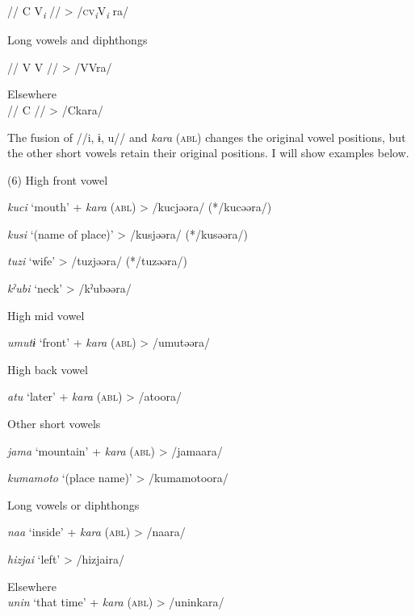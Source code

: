     //  C  V\textit{\textsubscript{i}}  //      >  /\textsc{cv}\textit{\textsubscript{i}}V\textit{\textsubscript{i} }ra/

 \ex Long vowels and diphthongs\\
\gll

    //  V  V  //      >  /VVra/

\ex  Elsewhere\\

    //  C  //        >  /Ckara/

The fusion of //i, ɨ, u// and \textit{kara} (\textsc{abl}) changes the original vowel positions, but the other short vowels retain their original positions. I will show examples below.

(6) \ea High front vowel  \\
\gll

    \textit{kuci}  ‘mouth’  +  \textit{kara} (\textsc{abl})  >  /kucjəəra/  (*/kucəəra/)

    \textit{kusi}  ‘(name of place)’      >  /kusjəəra/  (*/kusəəra/)

    \textit{tuzi}  ‘wife’      >  /tuzjəəra/  (*/tuzəəra/)

    \textit{kˀubi}  ‘neck’      >  /kˀubəəra/  

 \ex High mid vowel\\
\gll

    \textit{umutɨ}  ‘front’  +  \textit{kara} (\textsc{abl})  >  /umutəəra/

 \ex High back vowel  \\
\gll

    \textit{atu}  ‘later’  +  \textit{kara} (\textsc{abl})  >  /atoora/

 \ex Other short vowels\\
\gll

    \textit{jama}  ‘mountain’  +  \textit{kara} (\textsc{abl})  >  /jamaara/

    \textit{kumamoto}  ‘(place name)’      >  /kumamotoora/  

 \ex Long vowels or diphthongs  \\
\gll

    \textit{naa}  ‘inside’  +  \textit{kara} (\textsc{abl})  >  /naara/

    \textit{hizjai}  ‘left’      >  /hizjaira/  

\ex  Elsewhere\\

    \textit{unin}  ‘that time’  +  \textit{kara} (\textsc{abl})  >  /uninkara/

